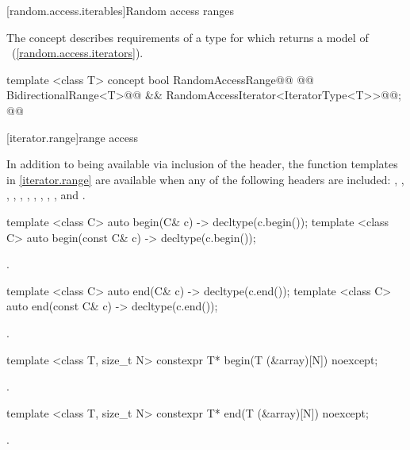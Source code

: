 \begin{addedblock}
[random.access.iterables]{Random access ranges}

\pnum
The  concept describes requirements of a
 type for which  returns a model of
~(\ref{random.access.iterators}).

\begin{codeblock}
template <class T>
concept bool RandomAccessRange@\newtxt{() \{}\oldtxt{ =}@
  @@ BidirectionalRange<T>@\newtxt{()}@ && RandomAccessIterator<IteratorType<T>>@\newtxt{()}@;
@\newtxt{\}}@
\end{codeblock}

\end{addedblock}

[iterator.range]{range access}

{\color{oldoldclr}
\pnum
In addition to being available via inclusion of the  header,
the function templates in \ref{iterator.range} are available when any of the following
headers are included: , , ,
, , , , ,
, , and .
}

{\color{oldoldclr}
%
\begin{itemdecl}
template <class C> auto begin(C& c) -> decltype(c.begin());
template <class C> auto begin(const C& c) -> decltype(c.begin());
\end{itemdecl}

\begin{itemdescr}
\pnum
\returns {}.
\end{itemdescr}

%
\begin{itemdecl}
template <class C> auto end(C& c) -> decltype(c.end());
template <class C> auto end(const C& c) -> decltype(c.end());
\end{itemdecl}

\begin{itemdescr}
\pnum
\returns {}.
\end{itemdescr}

%
\begin{itemdecl}
template <class T, size_t N> constexpr T* begin(T (&array)[N]) noexcept;
\end{itemdecl}

\begin{itemdescr}
\pnum
\returns {}.
\end{itemdescr}

%
\begin{itemdecl}
template <class T, size_t N> constexpr T* end(T (&array)[N]) noexcept;
\end{itemdecl}

\begin{itemdescr}
\pnum
\returns {}.
\end{itemdescr}
}

